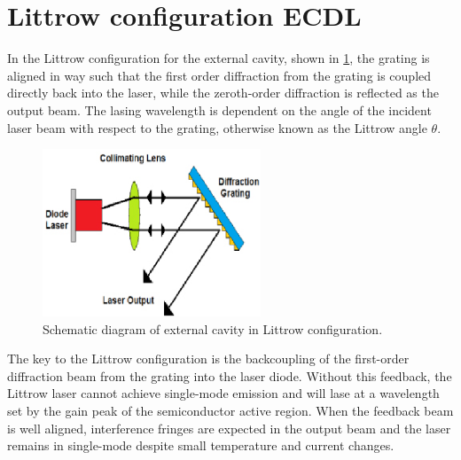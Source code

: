 	\section{Littrow configuration ECDL}\label{Littrowsection}
In the Littrow configuration for the external cavity, shown in \cref{littrow2}, the grating is aligned in way such that the first order diffraction from the grating is coupled directly back into the laser, while the zeroth-order diffraction is reflected as the output beam. The lasing wavelength is dependent on the angle of the incident laser beam with respect to the grating, otherwise known as the Littrow angle $\theta$.

\begin{figure}[!t]
\centering
\includegraphics[width=0.7\linewidth, height=5cm, draft=\foto]{eps/littrow2.eps}
\caption{Schematic diagram of external cavity in Littrow configuration.}
\label{littrow2}
\end{figure}

The key to the Littrow configuration is the backcoupling of the first-order diffraction beam from the grating into the laser diode. Without this feedback, the Littrow laser cannot achieve single-mode emission and will lase at a wavelength set by the gain peak of the semiconductor active region. When the feedback beam is well aligned, interference fringes are expected in the output beam and the laser remains in single-mode despite small temperature and current changes.

